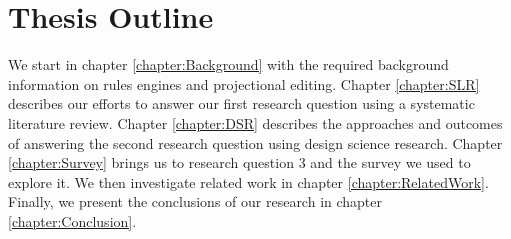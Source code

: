 \section{Thesis Outline}

We start in chapter \ref{chapter:Background} with the required background information on rules engines and projectional editing.
Chapter \ref{chapter:SLR} describes our efforts to answer our first research question using a systematic literature review. 
Chapter \ref{chapter:DSR} describes the approaches and outcomes of answering the second research question using design science research. 
Chapter \ref{chapter:Survey} brings us to research question 3 and the survey we used to explore it.
We then investigate related work in chapter \ref{chapter:RelatedWork}.
Finally, we present the conclusions of our research in chapter \ref{chapter:Conclusion}.
